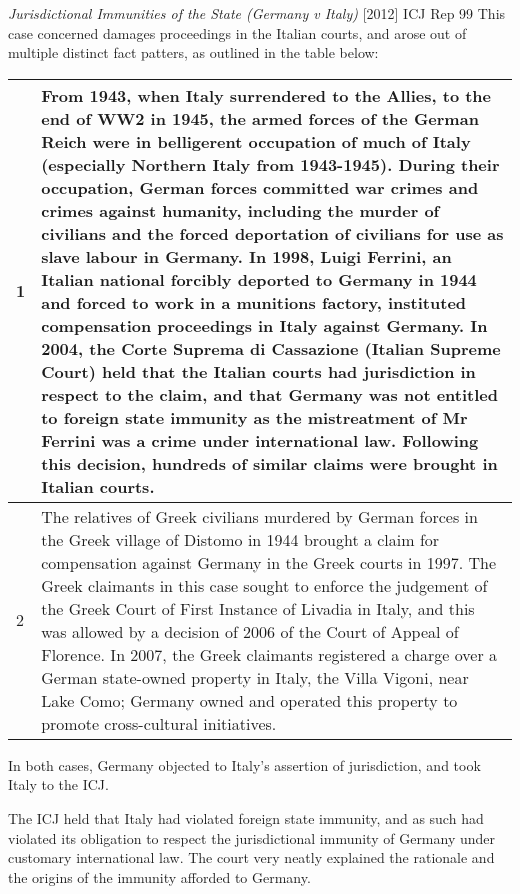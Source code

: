 \begin{casedetails}{\textit{Jurisdictional Immunities of the State (Germany v Italy)} [2012] ICJ Rep 99}
    \flushleft
    This case concerned damages proceedings in the Italian courts, and arose out of multiple distinct fact patters, as outlined in the table below:
    \begin{longtable}{p{}|>{\raggedright\arraybackslash}p{}}
        1 & From 1943, when Italy surrendered to the Allies, to the end of WW2 in 1945, the armed forces of the German Reich were in belligerent occupation of much of Italy (especially Northern Italy from 1943-1945). During their occupation, German forces committed war crimes and crimes against humanity, including the murder of civilians and the forced deportation of civilians for use as slave labour in Germany. In 1998, Luigi Ferrini, an Italian national forcibly deported to Germany in 1944 and forced to work in a munitions factory, instituted compensation proceedings in Italy against Germany. In 2004, the Corte Suprema di Cassazione (Italian Supreme Court) held that the Italian courts had jurisdiction in respect to the claim, and that Germany was not entitled to foreign state immunity as the mistreatment of Mr Ferrini was a crime under international law. Following this decision, hundreds of similar claims were brought in Italian courts. \\[0.5cm]\hline
        2 & The relatives of Greek civilians murdered by German forces in the Greek village of Distomo in 1944 brought a claim for compensation against Germany in the Greek courts in 1997. The Greek claimants in this case sought to enforce the judgement of the Greek Court of First Instance of Livadia in Italy, and this was allowed by a decision of 2006 of the Court of Appeal of Florence. In 2007, the Greek claimants registered a charge over a German state-owned property in Italy, the Villa Vigoni, near Lake Como; Germany owned and operated this property to promote cross-cultural initiatives.
    \end{longtable} 

    In both cases, Germany objected to Italy's assertion of jurisdiction, and took Italy to the ICJ.

    \tcblower
    \flushleft
    The ICJ held that Italy had violated foreign state immunity, and as such had violated its obligation to respect the jurisdictional immunity of Germany under customary international law. The court very neatly explained the rationale and the origins of the immunity afforded to Germany.


\end{casedetails}
